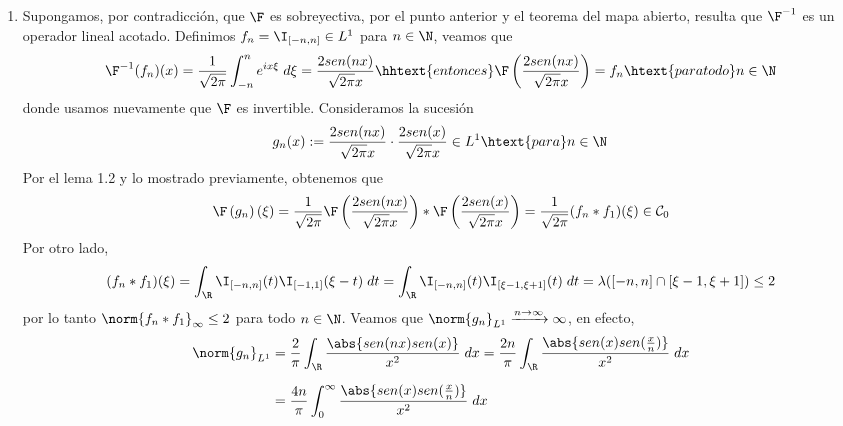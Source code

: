 \documentclass{article}
\begin{document}
\begin{enumerate}
\begin{enumerate}
        \item Supongamos, por contradicción, que $\F$ es sobreyectiva, por el punto anterior y el
        teorema del mapa abierto, resulta que $\F^{-1}$ es un operador lineal acotado. Definimos
        $f_{n}=\I_{[-n,n]}\in L^{1}$ para $n\in\N$, veamos que
        \begin{equation*}
            \F^{-1}(f_{n})(x)=\frac{1}{\sqrt{2\pi}}\int_{-n}^{n}e^{ix\xi}\hspace{1mm}d\xi
            =\frac{2sen(nx)}{\sqrt{2\pi}x}
            \hhtext{entonces}
            \F\left(\frac{2sen(nx)}{\sqrt{2\pi}x}\right)=f_{n}\htext{para todo}n\in\N
        \end{equation*}
        donde usamos nuevamente que $\F$ es invertible. Consideramos la sucesión
        \begin{equation*}
            g_{n}(x):=\frac{2sen(nx)}{\sqrt{2\pi}x}\cdot\frac{2sen(x)}{\sqrt{2\pi}x}\in L^{1}
            \htext{para}n\in\N
        \end{equation*}
        Por el lema 1.2 y lo mostrado previamente, obtenemos que
        \begin{equation*}
            \F\left(g_{n}\right)(\xi)=\frac{1}{\sqrt{2\pi}}
            \F\left(\frac{2sen(nx)}{\sqrt{2\pi}x}\right)
            *\F\left(\frac{2sen(x)}{\sqrt{2\pi}x}\right)=\frac{1}{\sqrt{2\pi}}(f_{n}*f_{1})(\xi)
            \in\mathcal{C}_{0}
        \end{equation*}
        Por otro lado,
        \begin{equation*}
            (f_{n}*f_{1})(\xi)=\int_{\R}\I_{[-n,n]}(t)\I_{[-1,1]}(\xi-t)\hspace{1mm}dt
            =\int_{\R}\I_{[-n,n]}(t)\I_{[\xi-1,\xi+1]}(t)\hspace{1mm}dt
            =\lambda([-n,n]\cap[\xi-1,\xi+1])\leq2
        \end{equation*}
        por lo tanto $\norm{f_{n}*f_{1}}_{\infty}\leq2$ para todo $n\in\N$. Veamos que 
        $\norm{g_{n}}_{L^{1}}\xrightarrow[]{n\to\infty}\infty$, en efecto,
        \begin{align*}
            \norm{g_{n}}_{L^{1}}
            &= \frac{2}{\pi}\int_{\R}\frac{\abs{sen(nx)sen(x)}}{x^{2}}\hspace{1mm}dx
            =\frac{2n}{\pi}\int_{\R}\frac{\abs{sen(x)sen(\frac{x}{n})}}{x^{2}}\hspace{1mm}dx 
            \\[2mm]
            &= \frac{4n}{\pi}\int_{0}^{\infty}
            \frac{\abs{sen(x)sen(\frac{x}{n})}}{x^{2}}\hspace{1mm}dx

\end{align*}
\end{enumerate}
\end{enumerate}
\end{document}
